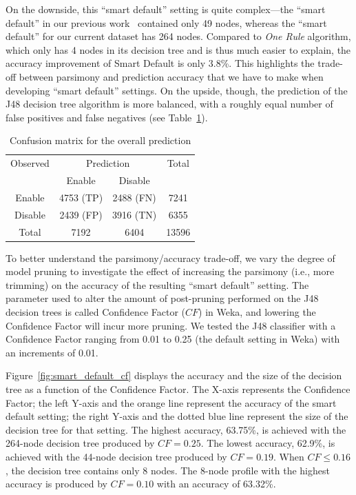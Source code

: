 On the downside, this ``smart default'' setting is quite complex---the ``smart default'' in our previous work~\cite{bahiratiui2018} contained only 49 nodes, whereas the ``smart default'' for our current dataset has 264 nodes. Compared to \textit{One Rule} algorithm, which only has 4 nodes in its decision tree and is thus much easier to explain, the accuracy improvement of Smart Default is only 3.8\%. This highlights the trade-off between parsimony and prediction accuracy that we have to make when developing ``smart default'' settings. On the upside, though, the prediction of the J48 decision tree algorithm is more balanced, with a roughly equal number of false positives and false negatives (see Table~\ref{tab:confusion_matrix}).


\begin{table}
	\centering
	\caption{Confusion matrix for the overall prediction}
	\label{tab:confusion_matrix}
	\begin{tabular}{c|c|c|c} \hline
		Observed &\multicolumn{2}{c|}{Prediction} & Total\\ \cline{2-3}
		& Enable     & Disable       &  \\ \hline
		Enable   & 4753 (TP) & 2488 (FN)  & 7241   \\ \hline
		Disable    & 2439 (FP)  & 3916 (TN) & 6355  \\ \hline
		Total & 7192     & 6404     & 13596  \\ \hline
	\end{tabular}
\end{table}

To better understand the parsimony/accuracy trade-off, we vary the degree of model pruning to investigate the effect of increasing the parsimony (i.e., more trimming) on the accuracy of the resulting ``smart default'' setting. The parameter used to alter the amount of post-pruning performed on the J48 decision trees is called Confidence Factor ($CF$) in Weka, and lowering the Confidence Factor will incur more pruning. We tested the J48 classifier with a Confidence Factor ranging from 0.01 to 0.25 (the default setting in Weka) with an increments of 0.01.

Figure~\ref{fig:smart_default_cf} displays the accuracy and the size of the decision tree as a function of the Confidence Factor. The X-axis represents the Confidence Factor; the left Y-axis and the orange line represent the accuracy of the smart default setting; the right Y-axis and the dotted blue line represent the size of the decision tree for that setting. The highest accuracy, 63.75\%, is achieved with the 264-node decision tree produced by $CF = 0.25$. The lowest accuracy, 62.9\%, is achieved with the 44-node decision tree produced by $CF = 0.19$. When $CF \leq 0.16$, the decision tree contains only 8 nodes. The 8-node profile with the highest accuracy is produced by $CF = 0.10$ with an accuracy of 63.32\%.

